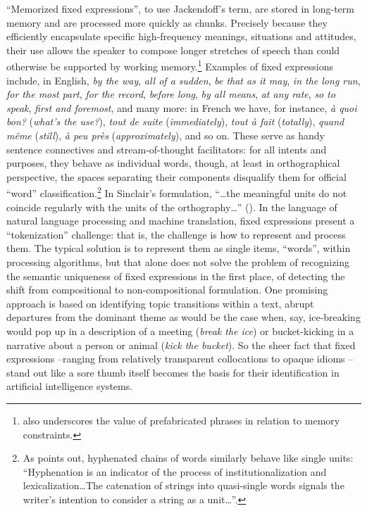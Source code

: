 \documentclass[output=paper]{langsci/langscibook}
\begin{document}
``Memorized fixed expressions'', to use Jackendoff’s term, are stored in long-term memory and are processed more quickly as chunks. Precisely because they efficiently encapsulate specific high-frequency meanings, situations and attitudes, their use allows the speaker to compose longer stretches of speech than could otherwise be supported by working memory.\footnote{\citet{bolinger_meaning_1976} also underscores the value of prefabricated phrases in relation to memory constraints.} Examples of fixed expressions include, in English, \textit{by the way}, \textit{all of a sudden}, \textit{be that as it may}, \textit{in the long run}, \textit{for the most part}, \textit{for the record}, \textit{before long}, \textit{by all means}, \textit{at any rate}, \textit{so to speak}, \textit{first and foremost}, and many more: in French we have, for instance, \textit{à quoi bon?} (\textit{what’s the use?}), \textit{tout de suite} (\textit{immediately}), \textit{tout à fait} (\textit{totally}), \textit{quand même} (\textit{still}), \textit{à peu près} (\textit{approximately}), and so on. These serve as handy sentence connectives and stream-of-thought facilitators: for all intents and purposes, they behave as individual words, though, at least in orthographical perspective, the spaces separating their components disqualify them for official ``word'' classification.\footnote{As \citet[43]{moon_fixed_1998} points out, hyphenated chains of words similarly behave like single units: “Hyphenation is an indicator of the process of institutionalization and lexicalization…The catenation of strings into quasi-single words signals the writer’s intention to consider a string as a unit…”.} In Sinclair’s formulation, “…the meaningful units do not coincide regularly with the units of the orthography…” (\citeyear[410]{granger_phrase_2008}). In the language of natural language processing and machine translation, fixed expressions present a ``tokenization'' challenge: that is, the challenge is how to represent and process them. The typical solution is to represent them as single items, ``words'', within processing algorithms, but that alone does not solve the problem of recognizing the semantic uniqueness of fixed expressions in the first place, of detecting the shift from compositional to non-compositional formulation. One promising approach is based on identifying topic transitions within a text, abrupt departures from the dominant theme as would be the case when, say, ice-breaking would pop up in a description of a meeting (\textit{break the ice}) or bucket-kicking in a narrative about a person or animal (\textit{kick the bucket}). So the sheer fact that fixed expressions –ranging from relatively transparent collocations to opaque idioms – stand out like a sore thumb itself becomes the basis for their identification in artificial intelligence systems.
\end{document}
